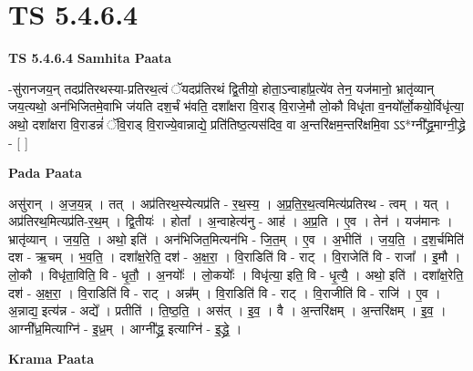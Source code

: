 \documentclass[17pt]{extarticle}
\begin{document}
\section{ TS 5.4.6.4 }

\textbf{TS 5.4.6.4 } \newline
\textbf{Samhita Paata} \newline

-सु॑रानजय॒न् तदप्र॑तिरथस्या-प्रतिरथ॒त्वं ॅयदप्र॑तिरथं द्वि॒तीयो॒ होता॒ऽन्वाहा᳚प्र॒त्ये॑व तेन॒ यज॑मानो॒ भ्रातृ॑व्यान् जय॒त्यथो॒ अन॑भिजितमे॒वाभि ज॑यति दश॒र्चं भ॑वति॒ दशा᳚क्षरा वि॒राड् वि॒राजे॒मौ लो॒कौ विधृ॑ता व॒नयो᳚र्लो॒कयो॒र्विधृ॑त्या॒ अथो॒ दशा᳚क्षरा वि॒राडन्नं॑ ॅवि॒राड् वि॒राज्ये॒वान्नाद्ये॒ प्रति॑तिष्ठ॒त्यस॑दिव॒ वा अ॒न्तरि॑क्षम॒न्तरि॑क्षमि॒वा ऽऽ*ग्नी᳚द्ध्र॒माग्नी॒द्ध्रे - [  ] \newline

\textbf{Pada Paata} \newline

असु॑रान् । अ॒ज॒य॒न्न् । तत् । अप्र॑तिरथ॒स्येत्यप्र॑ति - र॒थ॒स्य॒ । अ॒प्र॒ति॒र॒थ॒त्वमित्य॑प्रतिरथ - त्वम् । यत् । अप्र॑तिरथ॒मित्यप्र॑ति-र॒थ॒म् । द्वि॒तीयः॑ । होता᳚ । अ॒न्वाहेत्य॑नु - आह॑ । अ॒प्र॒ति । ए॒व । तेन॑ । यज॑मानः । भ्रातृ॑व्यान् । ज॒य॒ति॒ । अथो॒ इति॑ । अन॑भिजित॒मित्यन॑भि - जि॒त॒म् । ए॒व । अ॒भीति॑ । ज॒य॒ति॒ । द॒श॒र्चमिति॑ दश - ऋ॒चम् । भ॒व॒ति॒ । दशा᳚क्ष॒रेति॒ दश॑ - अ॒क्ष॒रा॒ । वि॒राडिति॑ वि - राट् । वि॒राजेति॑ वि - राजा᳚ । इ॒मौ । लो॒कौ । विधृ॑ता॒विति॒ वि - धृ॒तौ॒ । अ॒नयोः᳚ । लो॒कयोः᳚ । विधृ॑त्या॒ इति॒ वि - धृ॒त्यै॒ । अथो॒ इति॑ । दशा᳚क्ष॒रेति॒ दश॑ - अ॒क्ष॒रा॒ । वि॒राडिति॑ वि - राट् । अन्न᳚म् । वि॒राडिति॑ वि - राट् । वि॒राजीति॑ वि - राजि॑ । ए॒व । अ॒न्नाद्य॒ इत्य॑न्न - अद्ये᳚ । प्रतीति॑ । ति॒ष्ठ॒ति॒ । अस॑त् । इ॒व॒ । वै । अ॒न्तरि॑क्षम् । अ॒न्तरि॑क्षम् । इ॒व॒ । आग्नी᳚ध्र॒मित्याग्नि॑ - इ॒ध्र॒म् । आग्नी᳚द्ध्र॒ इत्याग्नि॑ - इ॒द्ध्रे॒ ।  \newline


\textbf{Krama Paata} \newline
\end{document}
